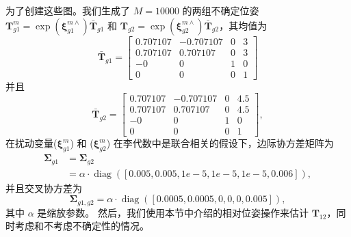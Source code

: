 为了创建这些图。我们生成了 $M=10000$ 的两组不确定位姿 $\mathbf{T}^m_{g1}=\operatorname{exp}(\boldsymbol{\xi}_{g1}^{m\wedge}) \bar{\mathbf{T}}_{g1}$  和 $\mathbf{T}_{g2}=\operatorname{exp}(\boldsymbol{\xi}_{g2}^{m\wedge}) \bar{\mathbf{T}}_{g2}$，其均值为 
\begin{equation}
    \bar{\mathbf{T}}_{g1} = \left[ \begin{array}{cccc}
        0.707107 & -0.707107  & 0      & 3 \\
        0.707107 &  0.707107  & 0      & 3 \\
       -0        &  0         & 1      & 0 \\
        0        &  0         & 0      & 1
    \end{array} \right]
\end{equation}  
并且
\begin{equation}
    \bar{\mathbf{T}}_{g2} = \left[ \begin{array}{cccc}
        0.707107 & -0.707107  & 0      & 4.5 \\
        0.707107 &  0.707107  & 0      & 4.5 \\
       -0        &  0         & 1      & 0 \\
        0        &  0         & 0      & 1
    \end{array} \right],
\end{equation}
在扰动变量($\boldsymbol{\xi}^m_{g1}$) 和 ($\boldsymbol{\xi}^m_{g2}$) 在李代数中是联合相关的假设下，边际协方差矩阵为 
\begin{align}
    \boldsymbol{\Sigma}_{g1} &= \boldsymbol{\Sigma}_{g2}  \\
    &= \alpha \cdot \operatorname{diag}([0.005, 0.005, 1e-5, 1e-5, 1e-5, 0.006]),  \nonumber
\end{align}
并且交叉协方差为
\begin{equation}
    \boldsymbol{\Sigma}_{g1,g2} = \alpha \cdot \operatorname{diag}([0.0005, 0.0005, 0, 0, 0, 0.005]),
\end{equation}
其中 $\alpha$ 是缩放参数。 
然后，我们使用本节中介绍的相对位姿操作来估计 $\mathbf{T}_{12}$，同时考虑和不考虑不确定性的情况。 


